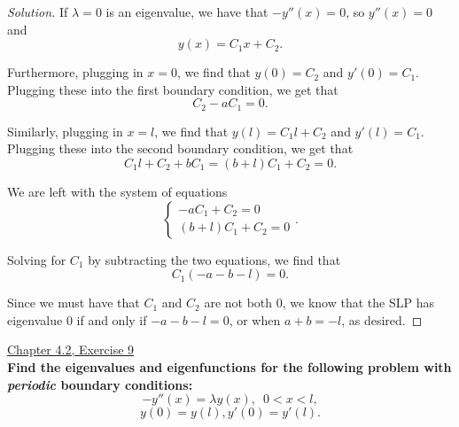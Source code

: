 \documentclass[11pt]{article}
\newenvironment{solution}
  {\renewcommand\qedsymbol{$\blacksquare$}\begin{proof}[Solution]}
  {\end{proof}}
\begin{document}
\begin{solution}
If $\lambda = 0$ is an eigenvalue, we have that $-y''(x) = 0$, so $y''(x) = 0$ and \[y(x) = C_1x + C_2.\]

Furthermore, plugging in $x = 0$, we find that $y(0) = C_2$ and $y'(0) = C_1$. Plugging these into the first boundary condition, we get that
\[ C_2 - aC_1 = 0.\]

Similarly, plugging in $x = l$, we find that $y(l) = C_1 l + C_2$ and $y'(l) = C_1$. Plugging these into the second boundary condition, we get that 
\[ C_1l + C_2 + bC_1 = (b+l) C_1 + C_2 = 0.\]

We are left with the system of equations
\[ \begin{cases}
    -aC_1 + C_2 = 0 \\
    (b+l)C_1 + C_2 = 0
\end{cases}. \]

Solving for $C_1$ by subtracting the two equations, we find that
\[ C_1(-a-b-l) = 0.\]

Since we must have that $C_1$ and $C_2$ are not both $0$, we know that the SLP has eigenvalue $0$ if and only if $-a-b-l = 0$, or when $a+b = -l$, as desired.
\end{solution}

\newpage

\underline{Chapter 4.2, Exercise 9} \\

\textbf{Find the eigenvalues and eigenfunctions for the following problem with \textit{periodic} boundary conditions:}
\[ -y''(x) = \lambda y(x), \, \, \, 0 < x < l, \]
\[ y(0) = y(l), y'(0) = y'(l).\]
\end{document}

